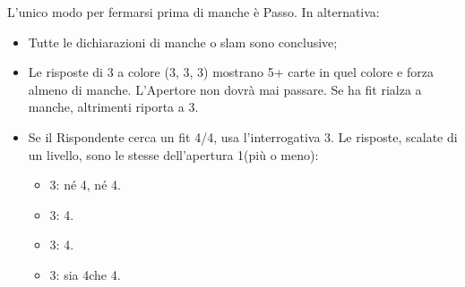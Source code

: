 \documentclass[../corsofiori.tex]{subfiles}
\begin{document}
L'unico modo per fermarsi prima di manche è Passo. In alternativa:

\begin{itemize}
    \item Tutte le dichiarazioni di manche o slam sono conclusive;
    \item Le risposte di 3 a colore (3\Di, 3\He, 3\Sp) mostrano 5+ carte in quel colore e forza almeno di manche.
        L'Apertore non dovrà mai passare. Se ha fit rialza a manche, altrimenti riporta a 3\SA.
    \item Se il Rispondente cerca un fit 4/4, usa l'interrogativa 3\Cl. Le risposte, scalate di un livello, sono le
        stesse dell'apertura 1\SA (più o meno):
        \begin{itemize}
            \item 3\Di: né 4\He, né 4\Sp.
            \item 3\He: 4\He.
            \item 3\Sp: 4\Sp.
            \item 3\SA: sia 4\Sp che 4\He.
        \end{itemize}
\end{itemize}
\end{document}
